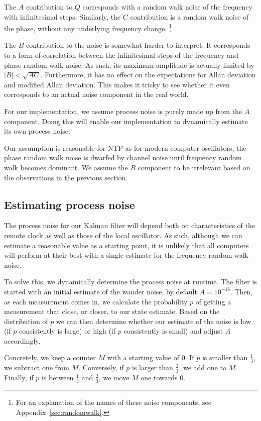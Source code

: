 \documentclass{article}
\begin{document}
The $A$ contribution to $Q$ corresponds with a random walk noise of the frequency with infinitesimal steps.
Similarly, the $C$ contribution is a random walk noise of the phase, without any underlying frequency change.
\footnote{For an explanation of the names of these noise components, see Appendix~\ref{sec:randomwalk}.}

The $B$ contribution to the noise is somewhat harder to interpret. It corresponds to a form of correlation between the infinitesimal steps
of the frequency and phase random walk noise. As such, its maximum amplitude is actually limited by $|B| < \sqrt{AC}$.
Furthermore, it has no effect on the expectations for Allan deviation and modified Allan deviation.
This makes it tricky to see whether it even corresponds to an actual noise component in the real world.

For our implementation, we assume process noise is purely made up from the $A$ component. Doing this will enable our implementation to dynamically
estimate its own process noise.

Our assumption is reasonable for NTP as for modern computer oscillators, the phase random walk noise is dwarfed by channel noise until frequency random
walk becomes dominant. 
We assume the $B$ component to be irrelevant based on the observations in the previous section.

\subsection{Estimating process noise}

The process noise for our Kalman filter will depend both on characteristics of the remote clock as well as those of the local oscillator.
As such, although we can estimate a reasonable value as a starting point, it is unlikely that all computers will perform at their best with
a single estimate for the frequency random walk noise.

To solve this, we dynamically determine the process noise at runtime.
The filter is started with an initial estimate of the wander noise, by default $A=10^{-16}$.
Then, as each measurement comes in, we calculate the probability $p$ of getting a measurement that close, or closer, to our state estimate.
Based on the distribution of $p$ we can then determine whether our estimate of the noise is low (if $p$ consistently is large) or high (if $p$ consistently is small) and adjust $A$ accordingly.

Concretely, we keep a counter $M$ with a starting value of $0$. If $p$ is smaller than $\frac{1}{3}$, we subtract one from $M$.
Conversely, if $p$ is larger than $\frac{2}{3}$, we add one to $M$. Finally, if $p$ is between $\frac{1}{3}$ and $\frac{2}{3}$, we move $M$ one towards $0$.
\end{document}
